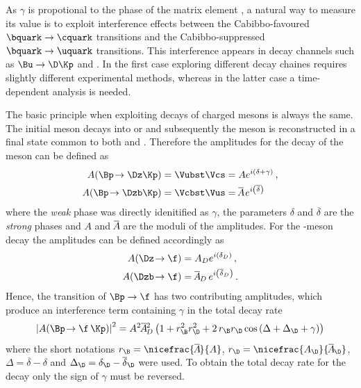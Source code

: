 As $\gamma$ is propotional to the phase of the matrix element \Vub, a natural way to measure its value is to exploit interference effects between the Cabibbo-favoured $\bquark\to\cquark$ transitions and the Cabibbo-suppressed $\bquark\to\uquark$ transitions.
This interference appears in decay channels such as $\Bu\to\D\Kp$ and \BsToDsK.
In the first case exploring different \D decay chaines requires slightly different experimental methods, whereas in the latter case a time-dependent analysis is needed.

The basic principle when exploiting decays of charged \B mesons is always the same.
The initial \Bpm meson decays into \Dz\Kpm or \Dzb\Kpm and subsequently the \D meson is reconstructed in a final state common to both \Dz and \Dzb.
Therefore the amplitudes for the decay of the \B meson can be defined as
\begin{equation}
\begin{aligned}
A\!\left(\Bp\!\to\Dz\Kp\right)&=\Vubst\Vcs=Ae^{i\left(\delta+\gamma\right)}\,,\\
A\!\left(\Bp\!\to\Dzb\Kp\right)&=\Vcbst\Vus=\overline{\kern -1.0pt A\kern -1.0pt}\,e^{i\left(\overline{\delta}\right)}
\end{aligned}
\end{equation}
where the \emph{weak} phase was directly idenitified as $\gamma$, the parameters $\delta$ and $\overline{\delta}$ are the \emph{strong} phases and $A$ and $\overline{\kern -1.0pt A\kern -1.0pt}$ are the moduli of the amplitudes.
For the \D-meson decay the amplitudes can be defined accordingly as
\begin{equation}
\begin{aligned}
A\!\left(\Dz\!\to\f\right)&=A_De^{i\left(\delta_D\right)}\,,\\
A\!\left(\Dzb\!\to\f\right)&=\overline{\kern -1.0pt A\kern -1.0pt}_D\,e^{i\left(\overline{\delta}_D\right)}\,.
\end{aligned}
\end{equation}
Hence, the transition of $\Bp\to\f$ has two contributing amplitudes, which produce an interference term containing $\gamma$ in the total decay rate
\begin{equation}
\left|A\!\left(\Bp\!\to\f\,\Kp\right)\right|^2=A^2\overline{\kern -1.0pt A\kern -1.0pt}{}_D^2\left(1+r_\B^2r_\D^2+2\,r_\B r_\D\cos\left(\Delta+\Delta_\D+\gamma\right)\right)\label{eq:totDecRateChargedB}
\end{equation}
where the short notations $r_\B=\nicefrac{\overline{\kern -1.0pt A\kern -1.0pt}}{A}$, $r_\D=\nicefrac{A_\D}{\overline{\kern -1.0pt A\kern -1.0pt}_\D}$, $\Delta=\overline{\delta}-\delta$ and $\Delta_\D=\delta_\D-\overline{\delta}_\D$ were used.
To obtain the total decay rate for the \Bm decay only the sign of $\gamma$ must be reversed.


